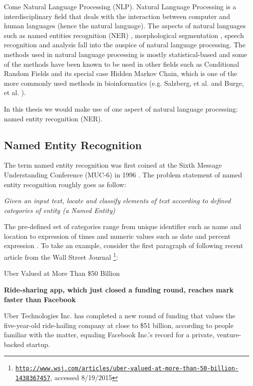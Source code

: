 Come Natural Language Processing (NLP). Natural Language Processing is a interdisciplinary field that deals with the interaction between computer and human languages (hence the natural language). The aspects of natural languages such as named entities recognition (NER) \citep{nadeau2007survey}, morphological segmentation \citep{meyer1990morphological}, speech recognition and analysis  \citep{rabiner1993fundamentals} fall into the auspice of natural language processing. The methods used in natural language processing is mostly statistical-based \citep{manning1999foundations} and some of the methods have been known to be used in other fields such as Conditional Random Fields \citep{sutton2006introduction} and its special case Hidden Markov Chain, which is one of the more commonly used methods in bioinformatics (e.g. Salzberg, et al. \citep{salzberg1998microbial} and Burge, et al. \citep{burge1998modeling}).

In this thesis we would make use of one aspect of natural language processing: named entity recognition (NER).




\subsection{Named Entity Recognition}

The term named entity recognition was first coined at the Sixth Message Understanding Conference (MUC-6) in 1996 \citep{nadeau2007survey} \citep{grishman1996message}. The problem statement of named entity recognition roughly goes as follow:

\begin{center}
\textit{Given an input text, locate and classify elements of text according to defined categories of entity (a Named Entity)}
\end{center}

The pre-defined set of categories range from unique identifier such as name and location to expression of times and numeric values such as date and percent expression \citep{nadeau2007survey}. To take an example, consider the first paragraph of following recent article from the Wall Street Journal \footnote{\texttt{\href{http://www.wsj.com/articles/uber-valued-at-more-than-50-billion-1438367457}{http://www.wsj.com/articles/uber-valued-at-more-than-50-billion-1438367457}}, accessed 8/19/2015}:

\begin{displayquote}
{\Large Uber Valued at More Than \$50 Billion}


\textbf{Ride-sharing app, which just closed a funding round, reaches mark faster than Facebook}

Uber Technologies Inc. has completed a new round of funding that values the five-year-old ride-hailing company at close to \$51 billion, according to people familiar with the matter, equaling Facebook Inc.’s record for a private, venture-backed startup.

\end{displayquote}

